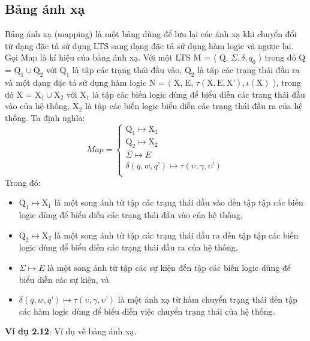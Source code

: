 \documentclass[a4paper,13pt,oneside,openany]{book}
\begin{document}
\begin{flushleft}
		\section{Bảng ánh xạ}
		Bảng ánh xạ (mapping) là một bảng dùng để lưu lại các ánh xạ khi chuyển đổi từ dạng đặc tả sử dụng LTS sang dạng đặc tả sử dụng hàm logic và ngược lại.\\
		Gọi Map là kí hiệu của bảng ánh xạ. Với một LTS M = $\langle$ Q, $\Sigma, \delta, q_{0}$ $\rangle$ trong đó Q = $\textrm{Q}_1 \cup \textrm{Q}_2$ với $\textrm{Q}_1$ là tập các trạng thái đầu vào, $\textrm{Q}_2$ là tập các trạng thái đầu ra và một dạng đặc tả sử dụng hàm logic N = $\langle$ X, E, $\tau(\textrm{X}, \textrm{E}, \textrm{X'}), \iota(\textrm{X})$ $\rangle$, trong đó X = $\textrm{X}_1 \cup \textrm{X}_2$ với $\textrm{X}_1$ là tập các biến logic dùng để biểu diễn các trang thái đầu vào của hệ thống, $\textrm{X}_2$ là tập các biến logic biểu diễn các trạng thái đầu ra của hệ thống. Ta định nghĩa:\\
		\[Map = \left\{
		\begin{array}{lr}
			\textrm{Q}_1 \mapsto \textrm{X}_1\\
			\textrm{Q}_2 \mapsto \textrm{X}_2\\
			\Sigma \mapsto E\\
			\delta(q, w, q\textrm{'}) \mapsto \tau(\upsilon, \gamma, \upsilon\textrm{'})\\
		\end{array}
		\right.
		\]
		Trong đó:\\
		\begin{itemize}
			\item $\textrm{Q}_1 \mapsto \textrm{X}_1$ là một song ánh từ tập các trạng thái đầu vào đến tập tập các biến logic dùng để biểu diễn các trạng thái đầu vào của hệ thống,
			\item $\textrm{Q}_2 \mapsto \textrm{X}_2$ là một song ánh từ tập các trạng thái đầu ra đến tập tập các biến logic dùng để biểu diễn các trạng thái đầu ra của hệ thống,
			\item $\Sigma \mapsto E$ là một song ánh từ tập các sự kiện đến tập các biến logic dùng để biểu diễn các sự kiện, và
			\item $\delta(q, w, q\textrm{'}) \mapsto \tau(\upsilon, \gamma, \upsilon\textrm{'})$ là một ánh xạ từ hàm chuyển trạng thái đến tập các hàm logic dùng để biểu diễn việc chuyển trạng thái của hệ thống.
		\end{itemize}
		\textbf{Ví dụ 2.12}: Ví dụ về bảng ánh xạ.\\

\end{flushleft}
\end{document}
